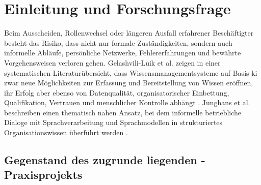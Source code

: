 \documentclass[
  10pt,
  ngerman,
  a4paper,
  toc=graduated,
  numbers=noenddot,
  headings=standardclasses,
  nonumberlist
]{scrartcl}
\begin{document}
\newpage
{}
{}
\listoffigures

\newpage
{}
{}
\listoftables

\newpage
\glsaddall[types=\acronymtype]
\printnoidxglossary[
    type=\acronymtype,
    style=list,
    title={Abkürzungsverzeichnis}
]

\newpage
{}
\setcounter{page}{7}
\glsresetall

\section{Einleitung und Forschungsfrage}

Beim Ausscheiden, Rollenwechsel oder längeren Ausfall erfahrener Beschäftigter besteht das Risiko, dass nicht nur formale Zuständigkeiten, sondern auch informelle Abläufe, persönliche Netzwerke, Fehlererfahrungen und bewährte Vorgehensweisen verloren gehen. Gelashvili-Luik et al. zeigen in einer systematischen Literaturübersicht, dass Wissensmanagementsysteme auf Basis \gls{ki} zwar neue Möglichkeiten zur Erfassung und Bereitstellung von Wissen eröffnen, ihr Erfolg aber ebenso von Datenqualität, organisatorischer Einbettung, Qualifikation, Vertrauen und menschlicher Kontrolle abhängt \cite{gelashvili2025}. Junghans et al. beschreiben einen thematisch nahen Ansatz, bei dem informelle betriebliche Dialoge mit Sprachverarbeitung und Sprachmodellen in strukturiertes Organisationswissen überführt werden \cite{junghans2026}.

\subsection{Gegenstand des zugrunde liegenden -Praxisprojekts}
\end{document}
